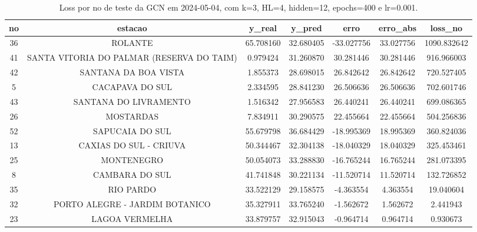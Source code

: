\begin{table}[h]
\centering
\caption{Loss por no de teste da GCN em 2024-05-04, com k=3, HL=4, hidden=12, epochs=400 e lr=0.001.}
\label{tab:gcn_loss_k3_hl4_h12_e400_d20240504}
\begin{tabular}{ccccccc}
\toprule
no & estacao & y\_real & y\_pred & erro & erro\_abs & loss\_no \\
\midrule
36 & ROLANTE & 65.708160 & 32.680405 & -33.027756 & 33.027756 & 1090.832642 \\
41 & SANTA VITORIA DO PALMAR (RESERVA DO TAIM) & 0.979424 & 31.260870 & 30.281446 & 30.281446 & 916.966003 \\
42 & SANTANA DA BOA VISTA & 1.855373 & 28.698015 & 26.842642 & 26.842642 & 720.527405 \\
5 & CACAPAVA DO SUL & 2.334595 & 28.841230 & 26.506636 & 26.506636 & 702.601746 \\
43 & SANTANA DO LIVRAMENTO & 1.516342 & 27.956583 & 26.440241 & 26.440241 & 699.086365 \\
26 & MOSTARDAS & 7.834911 & 30.290575 & 22.455664 & 22.455664 & 504.256836 \\
52 & SAPUCAIA DO SUL & 55.679798 & 36.684429 & -18.995369 & 18.995369 & 360.824036 \\
13 & CAXIAS DO SUL - CRIUVA & 50.344467 & 32.304138 & -18.040329 & 18.040329 & 325.453461 \\
25 & MONTENEGRO & 50.054073 & 33.288830 & -16.765244 & 16.765244 & 281.073395 \\
8 & CAMBARA DO SUL & 41.741848 & 30.221134 & -11.520714 & 11.520714 & 132.726852 \\
35 & RIO PARDO & 33.522129 & 29.158575 & -4.363554 & 4.363554 & 19.040604 \\
32 & PORTO ALEGRE - JARDIM BOTANICO & 35.327911 & 33.765240 & -1.562672 & 1.562672 & 2.441943 \\
23 & LAGOA VERMELHA & 33.879757 & 32.915043 & -0.964714 & 0.964714 & 0.930673 \\
\bottomrule
\end{tabular}
\end{table}
